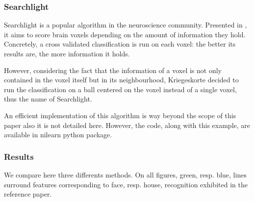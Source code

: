 \documentclass{frontiersSCNS} %
\begin{document}



\subsubsection{Searchlight}
\label{searchlight}

Searchlight is a popular algorithm in the neuroscience community.
Presented in \cite{kriegeskorte2006}, it aims to score
brain voxels depending on the amount of information they hold. Concretely, a
cross validated classification is run on each voxel: the better its results are,
the more information it holds.

However, considering the fact that the information of a voxel is not only
contained in the voxel itself but in its neighbourhood, Kriegeskorte decided to run
the classification on a ball centered on the voxel instead of a single voxel,
thus the name of Searchlight.

An efficient implementation of this algorithm is way beyond the scope of this
paper also it is not detailed here. However, the code, along with this example,
are available in nilearn python package.

\subsubsection{Results}

We compare here three differents methods. On all figures, green, resp. blue,
lines surround features corresponding to face, resp. house, recognition
exhibited in the reference paper.
\end{document}
